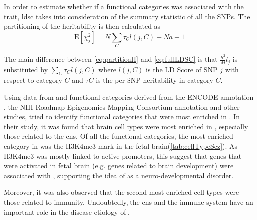 	In order to estimate whether if a functional categories was associated with the trait, \gls{ldsc} takes into consideration of the summary statistic of all the \glspl{SNP}.
	The partitioning of the heritability is then calculated as 
	\begin{equation}
	\mathrm{E}[\chi^2_j] = N\sum_C\tau_Cl(j,C)+Na+1
	\label{eq:partitionH}
	\end{equation}
	
	The main difference between \cref{eq:partitionH} and \cref{eq:fullLDSC} is that $\frac{h^2}{M}l_j$ is substituted by $\sum_C\tau_Cl(j,C)$ where $l(j,C)$ is the \gls{LD} Score of \gls{SNP} $j$ with respect
	to category $C$ and $\tau C$ is the per-\gls{SNP} heritability in category $C$.
	
	Using data from \citet{Ripke2014} and functional categories derived from the ENCODE annotation \citep{ENCODEProjectConsortium2012}, the NIH Roadmap Epigenomics Mapping Consortium annotation \citep{Bernstein2010} and other studies, \citep{Finucane2015} tried to identify functional categories that were most enriched in .
	In their study, it was found that brain cell types were most enriched in , especially those related to the \gls{cns}.
	Of all the functional categories, the most enriched category in  was the H3K4me3 mark in the fetal brain(\cref{tab:cellTypeScz}). 
	As H3K4me3 was mostly linked to active promoters, this suggest that genes that were activated in fetal brain (e.g. genes related to brain development) were associated with , supporting the idea of  as a neuro-developmental disorder. 
		
	Moreover, it was also observed that the second most enriched cell types were those related to immunity.
	Undoubtedly, the \gls{cns} and the immune system have an important role in the disease etiology of . 
		
